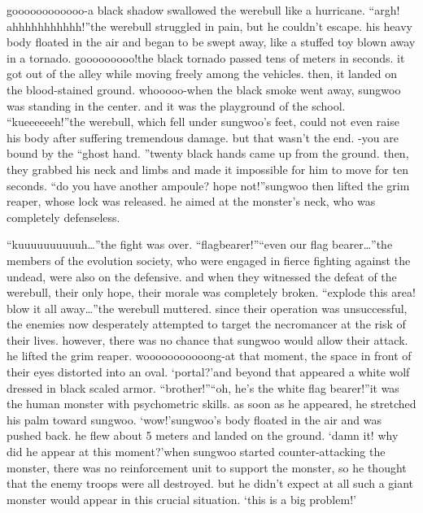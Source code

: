 goooooooooooo-a black shadow swallowed the werebull like a hurricane.
“argh! ahhhhhhhhhhh!”the werebull struggled in pain, but he couldn’t escape.
 his heavy body floated in the air and began to be swept away, like a stuffed toy blown away in a tornado.
gooooooooo!the black tornado passed tens of meters in seconds.
 it got out of the alley while moving freely among the vehicles.
 then, it landed on the blood-stained ground.
whooooo-when the black smoke went away, sungwoo was standing in the center.
 and it was the playground of the school.
“kueeeeeeh!”the werebull, which fell under sungwoo’s feet, could not even raise his body after suffering tremendous damage.
 but that wasn’t the end.
-you are bound by the “ghost hand.
”twenty black hands came up from the ground.
 then, they grabbed his neck and limbs and made it impossible for him to move for ten seconds.
“do you have another ampoule? hope not!”sungwoo then lifted the grim reaper, whose lock was released.
 he aimed at the monster’s neck, who was completely defenseless.


“kuuuuuuuuuuh…”the fight was over.
“flagbearer!”“even our flag bearer…”the members of the evolution society, who were engaged in fierce fighting against the undead, were also on the defensive.
 and when they witnessed the defeat of the werebull, their only hope, their morale was completely broken.
“explode this area! blow it all away…”the werebull muttered.
since their operation was unsuccessful, the enemies now desperately attempted to target the necromancer at the risk of their lives.
however, there was no chance that sungwoo would allow their attack.
he lifted the grim reaper.
wooooooooooong-at that moment, the space in front of their eyes distorted into an oval.
‘portal?’and beyond that appeared a white wolf dressed in black scaled armor.
“brother!”“oh, he’s the white flag bearer!”it was the human monster with psychometric skills.
 as soon as he appeared, he stretched his palm toward sungwoo.
‘wow!’sungwoo’s body floated in the air and was pushed back.
 he flew about 5 meters and landed on the ground.
‘damn it! why did he appear at this moment?’when sungwoo started counter-attacking the monster, there was no reinforcement unit to support the monster, so he thought that the enemy troops were all destroyed.
but he didn’t expect at all such a giant monster would appear in this crucial situation.
‘this is a big problem!’ 

 